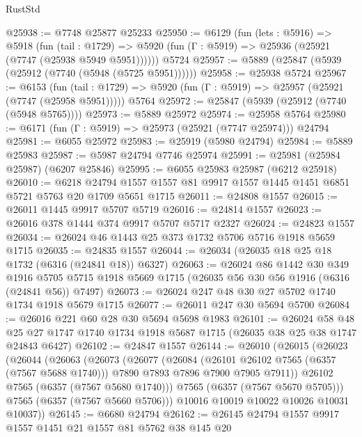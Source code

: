 \begin{lexlean}{RustStd}
\begin{coremodule}
@25938 := @7748 @25877 @25233
@25950 := @6129
    (fun (lets : @5916) =>
    @5918
      (fun (tail : @1729) =>
      @5920 (fun (Γ : @5919) => @25936 (@25921 (@7747 (@25938 @5949 @5951))))))
    @5724
@25957 := @5889 (@25847 (@5939 (@25912 (@7740 (@5948 (@5725 @5951))))))
@25958 := @25938 @5724
@25967 := @6153
    (fun (tail : @1729) => @5920 (fun (Γ : @5919) => @25957 (@25921 (@7747 (@25958 @5951)))))
    @5764
@25972 := @25847 (@5939 (@25912 (@7740 (@5948 @5765))))
@25973 := @5889 @25972
@25974 := @25958 @5764
@25980 := @6171 (fun (Γ : @5919) => @25973 (@25921 (@7747 @25974))) @24794
@25981 := @6055 @25972
@25983 := @25919 (@5980 @24794)
@25984 := @5889 @25983
@25987 := @5987 @24794 @7746 @25974
@25991 := @25981 (@25984 @25987) (@6207 @25846)
@25995 := @6055 @25983 @25987 (@6212 @25918)
@26010 := @6218
    @24794
    @1557
    @1557
    @81
    @9917
    @1557
    @1445
    @1451
    @6851
    @5721
    @5763
    @20
    @1709
    @5651
    @1715
@26011 := @24808 @1557
@26015 := @26011 @1445 @9917 @5707 @5719
@26016 := @24814 @1557
@26023 := @26016 @378 @1444 @374 @9917 @5707 @5717 @2327
@26024 := @24823 @1557
@26034 := @26024 @46 @1443 @25 @373 @1732 @5706 @5716 @1918 @5659 @1715
@26035 := @24835 @1557
@26044 := @26034 (@26035 @18 @25 @18 @1732 (@6316 (@24841 @18)) @6327)
@26063 := @26024
    @86
    @1442
    @30
    @349
    @1916
    @5705
    @5715
    @1918
    @5669
    @1715
    (@26035 @56 @30 @56 @1916 (@6316 (@24841 @56)) @7497)
@26073 := @26024 @247 @48 @30 @27 @5702 @1740 @1734 @1918 @5679 @1715
@26077 := @26011 @247 @30 @5694 @5700
@26084 := @26016 @221 @60 @28 @30 @5694 @5698 @1983
@26101 := @26024
    @58
    @48
    @25
    @27
    @1747
    @1740
    @1734
    @1918
    @5687
    @1715
    (@26035 @38 @25 @38 @1747 @24843 @6427)
@26102 := @24847 @1557
@26144 := @26010
    (@26015
      (@26023
        (@26044
          (@26063
            (@26073
              (@26077
                (@26084
                  (@26101 @26102 @7565 (@6357 (@7567 @5688 @1740)))
                  @7890
                  @7893
                  @7896
                  @7900
                  @7905
                  @7911))
              @26102
              @7565
              (@6357 (@7567 @5680 @1740)))
            @7565
            (@6357 (@7567 @5670 @5705)))
          @7565
          (@6357 (@7567 @5660 @5706)))
        @10016
        @10019
        @10022
        @10026
        @10031
        @10037))
@26145 := @6680 @24794
@26162 := @26145
    @24794
    @1557
    @9917
    @1557
    @1451
    @21
    @1557
    @81
    @5762
    @38
    @145
    @20

\end{coremodule}
\end{lexlean}
